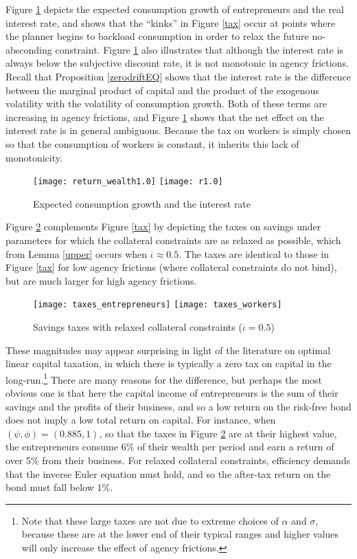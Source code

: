 \documentclass[11pt]{article}
\theoremstyle{plain}
\theoremstyle{definition} %
\begin{document}
Figure \ref{r_muc} depicts the expected consumption growth of entrepreneurs and the real interest rate, and shows that the ``kinks'' in Figure \ref{tax} occur at points where the planner begins to backload consumption in order to relax the future no-absconding constraint. Figure \ref{r_muc} also illustrates that although the interest rate is always below the subjective discount rate, it is not monotonic in agency frictions. Recall that Proposition \ref{zerodriftEQ} shows that the interest rate is the difference between the marginal product of capital and the product of the exogenous volatility with the volatility of consumption growth. Both of these terms are increasing in agency frictions, and Figure \ref{r_muc} shows that the net effect on the interest rate is in general ambiguous. Because the tax on workers is simply chosen so that the consumption of workers is constant, it inherits this lack of monotonicity. 

\begin{figure}[H]
\centering
\caption{Expected consumption growth and the interest rate}
\texttt{[image: return\_wealth1.0]}
\texttt{[image: r1.0]}
\label{r_muc} 
\end{figure} 

Figure \ref{tax2} complements Figure \ref{tax} by depicting the taxes on savings under parameters for which the collateral constraints are as relaxed as possible, which from Lemma \ref{upper} occurs when $\overline{\iota} \approx 0.5$. The taxes are identical to those in Figure \ref{tax} for low agency frictions (where collateral constraints do not bind), but are much larger for high agency frictions. 

\begin{figure}[H]
\centering
\caption{Savings taxes with relaxed collateral constraints ($\overline{\iota}=0.5$)}
\texttt{[image: taxes\_entrepreneurs]}
\texttt{[image: taxes\_workers]}
\label{tax2} 
\end{figure} 

These magnitudes may appear surprising in light of the literature on optimal linear capital taxation, in which there is typically a zero tax on capital in the long-run.\footnote{Note that these large taxes are not due to extreme choices of $\alpha$ and $\sigma$, because these are at the lower end of their typical ranges and higher values will only increase the effect of agency frictions.} There are many reasons for the difference, but perhaps the most obvious one is that here the capital income of entrepreneurs is the sum of their savings and the profits of their business, and so a low return on the risk-free bond does not imply a low total return on capital. For instance, when $(\psi, \phi) = (0.885, 1)$, so that the taxes in Figure \ref{tax2} are at their highest value, the entrepreneurs consume 6\% of their wealth per period and earn a return of over 5\% from their business. For relaxed collateral constraints, efficiency demands that the inverse Euler equation must hold, and so the after-tax return on the bond must fall below 1\%.
\end{document}
